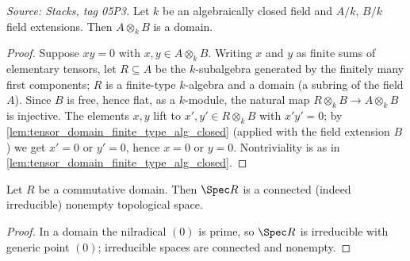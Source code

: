 \begin{lemma}

  \label{lem:tensor_domain_alg_closed}
  \textit{Source: Stacks, tag 05P3.}
  Let \(k\) be an algebraically closed field and \(A/k\), \(B/k\) field
  extensions. Then \(A \otimes_k B\) is a domain.
\end{lemma}
\begin{proof}
  \leanok
  Suppose \(x y = 0\) with \(x, y \in A \otimes_k B\). Writing \(x\) and
  \(y\) as finite sums of elementary tensors, let \(R \subseteq A\) be
  the \(k\)-subalgebra generated by the finitely many first components;
  \(R\) is a finite-type \(k\)-algebra and a domain (a subring of the
  field \(A\)). Since \(B\) is free, hence flat, as a \(k\)-module, the
  natural map \(R \otimes_k B \to A \otimes_k B\) is injective. The
  elements \(x, y\) lift to \(x', y' \in R \otimes_k B\) with
  \(x' y' = 0\); by \cref{lem:tensor_domain_finite_type_alg_closed}
  (applied with the field extension \(B\)) we get \(x' = 0\) or
  \(y' = 0\), hence \(x = 0\) or \(y = 0\). Nontriviality is as in
  \cref{lem:tensor_domain_finite_type_alg_closed}.
\end{proof}

\begin{lemma}

  \label{lem:spec_domain_connected}
  Let \(R\) be a commutative domain. Then \(\Spec R\) is a connected
  (indeed irreducible) nonempty topological space.
\end{lemma}
\begin{proof}
  \leanok
  In a domain the nilradical \((0)\) is prime, so \(\Spec R\) is
  irreducible with generic point \((0)\); irreducible spaces are
  connected and nonempty.
\end{proof}

